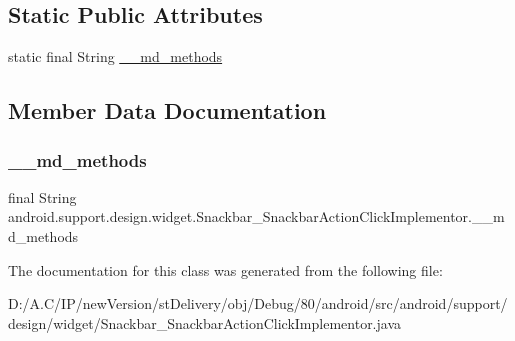 \subsection*{Static Public Attributes}
\begin{DoxyCompactItemize}
\item 
static final String \hyperlink{classandroid_1_1support_1_1design_1_1widget_1_1_snackbar___snackbar_action_click_implementor_aad3fa0ac0be924f89fc03341fb991061}{\+\_\+\+\_\+md\+\_\+methods}
\end{DoxyCompactItemize}


\subsection{Member Data Documentation}
\mbox{\label{classandroid_1_1support_1_1design_1_1widget_1_1_snackbar___snackbar_action_click_implementor_aad3fa0ac0be924f89fc03341fb991061}} 
\subsubsection{\texorpdfstring{\+\_\+\+\_\+md\+\_\+methods}{\_\_md\_methods}}
{\footnotesize\ttfamily final String android.\+support.\+design.\+widget.\+Snackbar\+\_\+\+Snackbar\+Action\+Click\+Implementor.\+\_\+\+\_\+md\+\_\+methods\hspace{0.3cm}{\ttfamily [static]}}



The documentation for this class was generated from the following file\+:\begin{DoxyCompactItemize}
\item 
D\+:/\+A.\+C/\+I\+P/new\+Version/st\+Delivery/obj/\+Debug/80/android/src/android/support/design/widget/Snackbar\+\_\+\+Snackbar\+Action\+Click\+Implementor.\+java\end{DoxyCompactItemize}
